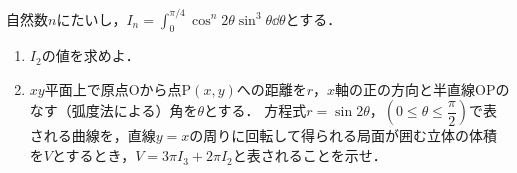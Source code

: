\documentclass[../../main.tex]{subfiles}
\begin{document}
自然数$n$にたいし，${\displaystyle I_n=\int_{0}^{\pi/4}\cos^n 2\theta \sin^3\theta \dd\theta}$とする．
\begin{enumerate}
  \item $I_2$の値を求めよ．
  \item $xy$平面上で原点$\mathrm{O}$から点$\mathrm{P}(x,y)$への距離を$r$，$x$軸の正の方向と半直線$\mathrm{OP}$のなす（弧度法による）角を$\theta$とする．
    方程式$r=\sin 2\theta$，$\left(0\le\theta\le\dfrac{\pi}{2}\right)$で表される曲線を，直線$y=x$の周りに回転して得られる局面が囲む立体の体積を$V$とするとき，$V=3\pi I_3+2\pi I_2$と表されることを示せ．
\end{enumerate}
\end{document}
